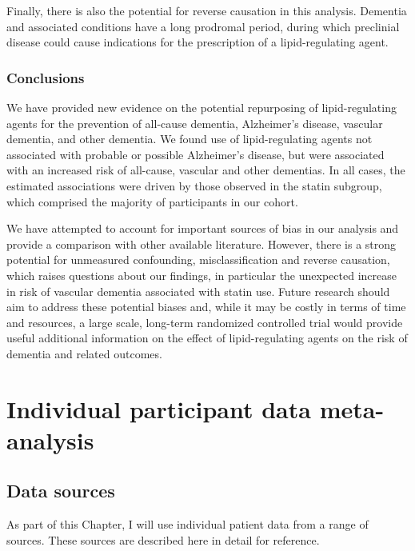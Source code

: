 \documentclass[a4paper, twoside]{templates/ociamthesis}
\begin{document}
Finally, there is also the potential for reverse causation in this analysis. Dementia and associated conditions have a long prodromal period, during which preclinial disease could cause indications for the prescription of a lipid-regulating agent.

\hypertarget{conclusions}{%
\subsection{Conclusions}\label{conclusions}}

We have provided new evidence on the potential repurposing of lipid-regulating agents for the prevention of all-cause dementia, Alzheimer's disease, vascular dementia, and other dementia. We found use of lipid-regulating agents not associated with probable or possible Alzheimer's disease, but were associated with an increased risk of all-cause, vascular and other dementias. In all cases, the estimated associations were driven by those observed in the statin subgroup, which comprised the majority of participants in our cohort.

We have attempted to account for important sources of bias in our analysis and provide a comparison with other available literature. However, there is a strong potential for unmeasured confounding, misclassification and reverse causation, which raises questions about our findings, in particular the unexpected increase in risk of vascular dementia associated with statin use. Future research should aim to address these potential biases and, while it may be costly in terms of time and resources, a large scale, long-term randomized controlled trial would provide useful additional information on the effect of lipid-regulating agents on the risk of dementia and related outcomes.

\hypertarget{ipd-heading}{%
\chapter{Individual participant data meta-analysis}\label{ipd-heading}}

\minitoc 

\hypertarget{data-sources}{%
\section{Data sources}\label{data-sources}}

As part of this Chapter, I will use individual patient data from a range of sources. These sources are described here in detail for reference.
\end{document}
